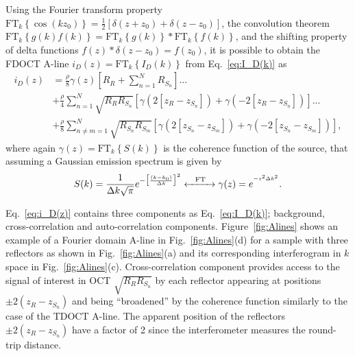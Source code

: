 Using the Fourier transform property $\text{FT}_k\left\{\cos(kz_0)\right\} = \frac{1}{2}\left[\delta\left(z+z_0\right) + \delta\left(z-z_0\right)\right]$, the convolution theorem $\text{FT}_k\left\{g\left(k\right)f\left(k\right)\right\} = \text{FT}_k\left\{g\left(k\right)\right\} \ast \text{FT}_k\left\{f\left(k\right)\right\}$, and the shifting property of delta functions $f(z)*\delta\left(z-z_0\right) = f(z_0)$, it is possible to obtain the FDOCT A-line $i_D(z) = \text{FT}_k\left\{I_D(k)\right\}$ from Eq.~\ref{eq:I_D(k)} as~\cite{Izatt2015_Theory}
\begin{align}\label{eq:i_D(z)}
    i_D(z) &= \frac{\rho}{8}\gamma\left(z\right)\left[R_R + \sum_{n=1}^NR_{S_n}\right] ... \nonumber\\
    &+ \frac{\rho}{4}\sum_{n=1}^N \sqrt{R_RR_{S_n}} \left[\gamma\left(2\left[z_R-z_{S_n}\right]\right) + \gamma\left(-2\left[z_R-z_{S_n}\right]\right)\right]...\\
    &+ \frac{\rho}{8}\sum_{n\neq m=1}^N \sqrt{R_{S_n}R_{S_m}} \left[\gamma\left(2\left[z_{S_n}-z_{S_m}\right]\right) + \gamma\left(-2\left[z_{S_n}-z_{S_m}\right]\right)\right], \nonumber
\end{align}
where again $\gamma\left(z\right)=\text{FT}_k\left\{S(k)\right\}$ is the coherence function of the source, that assuming a Gaussian emission spectrum is given by
\begin{align} \label{eq:SGamma}
    S(k) =\frac{1}{\Delta k\sqrt{\pi}}e^{-\big[\frac{(k-k_0)}{\Delta k}\big]^2} \xleftrightarrow{\hspace{8 pt}\text{FT}\hspace{8 pt}} \gamma(z) = e^{^{-z^2\Delta k^2}}.
\end{align}

Eq.~\eqref{eq:i_D(z)} contains three components as Eq.~\eqref{eq:I_D(k)}; background, cross-correlation and auto-correlation components. Figure~\ref{fig:Alines} shows an example of a Fourier domain A-line in Fig.~\ref{fig:Alines}(d) for a sample with three reflectors as shown in Fig.~\ref{fig:Alines}(a) and its corresponding interferogram in $k$ space in Fig.~\ref{fig:Alines}(c). Cross-correlation component provides access to the signal of interest in OCT $\sqrt{R_RR_{S_n}}$ by each reflector appearing at positions $\pm2(z_R-z_{S_n})$ and being ``broadened'' by the coherence function similarly to the case of the TDOCT A-line. The apparent position of the reflectors $\pm2(z_R-z_{S_n})$ have a factor of 2 since the interferometer measures the round-trip distance.

